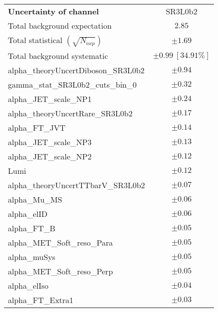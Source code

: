 
\begin{table}
\begin{center}
\setlength{\tabcolsep}{0.0pc}
\begin{tabular*}{\textwidth}{@{\extracolsep{\fill}}lc}
\noalign{\smallskip}\hline\noalign{\smallskip}
{\bfseries Uncertainty of channel}                                    & SR3L0b2            \\
\noalign{\smallskip}\hline\noalign{\smallskip}
Total background expectation             &  $2.85$       \\
\noalign{\smallskip}\hline\noalign{\smallskip}
Total statistical $(\sqrt{N_{\mathrm exp}})$              & $\pm 1.69$       \\
Total background systematic               & $\pm 0.99\ [34.91\%] $             \\
\noalign{\smallskip}\hline\noalign{\smallskip}
\noalign{\smallskip}\hline\noalign{\smallskip}
alpha\_theoryUncertDiboson\_SR3L0b2         & $\pm 0.94$       \\
gamma\_stat\_SR3L0b2\_cuts\_bin\_0         & $\pm 0.32$       \\
alpha\_JET\_scale\_NP1         & $\pm 0.24$       \\
alpha\_theoryUncertRare\_SR3L0b2         & $\pm 0.17$       \\
alpha\_FT\_JVT         & $\pm 0.14$       \\
alpha\_JET\_scale\_NP3         & $\pm 0.13$       \\
alpha\_JET\_scale\_NP2         & $\pm 0.12$       \\
Lumi         & $\pm 0.12$       \\
alpha\_theoryUncertTTbarV\_SR3L0b2         & $\pm 0.07$       \\
alpha\_Mu\_MS         & $\pm 0.06$       \\
alpha\_elID         & $\pm 0.06$       \\
alpha\_FT\_B         & $\pm 0.05$       \\
alpha\_MET\_Soft\_reso\_Para         & $\pm 0.05$       \\
alpha\_muSys         & $\pm 0.05$       \\
alpha\_MET\_Soft\_reso\_Perp         & $\pm 0.05$       \\
alpha\_elIso         & $\pm 0.04$       \\
alpha\_FT\_Extra1         & $\pm 0.03$       \\

\end{tabular*}
\end{center}
\end{table}
